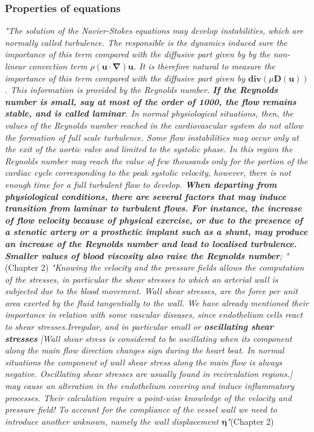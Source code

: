 \documentclass[11pt,letterpaper]{article}
\begin{document}
\subsubsection*{Properties of equations}\textit{"The solution of the Navier-Stokes equations may develop instabilities,
which are normally called turbulence. The responsible is the dynamics induced sure the importance of this term compared with the diffusive part given by by the non-linear convection term $ \rho (\bm{u} \cdot \bm{\nabla})\bm{u}$. It is therefore natural to measure the importance of this term compared with the diffusive part given by $\bm{div}(\mu \bm{D}(\bm{u}))$. This information is provided by the Reynolds number.  \textbf{If the Reynolds number is small, say at most of the order of 1000, the flow remains stable, and is called laminar}. In normal physiological situations, then, the values of the Reynolds number reached in the cardiovascular system do not allow the formation of full scale turbulence. Some flow instabilities may occur only at the exit of the aortic valve and limited to the systolic phase. In this region the Reynolds number may reach the value of few thousands only for the portion of the cardiac cycle corresponding to the peak systolic velocity, however, there is not enough time for a full turbulent flow to develop. \textbf{When departing from physiological conditions, there are several factors that may induce transition from laminar to turbulent flows. For instance, the increase of flow velocity because of physical exercise, or due to the presence of a stenotic artery or a prosthetic implant such as a shunt, may produce an increase of the Reynolds number and lead to localised turbulence. Smaller values of blood viscosity also raise the Reynolds number}; "}(Chapter 2)
\newline\newline \textit{"Knowing the velocity and the pressure fields allows the computation of the stresses, in particular the shear stresses to which an arterial wall is subjected  due to the blood movement. Wall shear stresses, are the force per unit area exerted by the
fluid tangentially to the wall. We have already mentioned their importance in relation with some vascular diseases, since endothelium cells react to shear stresses.Irregular, and in particular small or \textbf{oscillating shear stresses} \textit{[Wall shear stress is considered to be oscillating when its component along the main flow direction changes sign during the heart beat. In normal situations the component of wall shear stress along the main flow is always negative. Oscillating shear stresses are usually found in recirculation regions.]} may cause an alteration in the endothelium covering and induce inflammatory processes. Their calculation require a point-wise knowledge of the velocity and pressure field! To account for the compliance of the vessel wall we need to introduce
another unknown, namely the wall displacement $\bm{\eta}$"}(Chapter 2)
\end{document}
